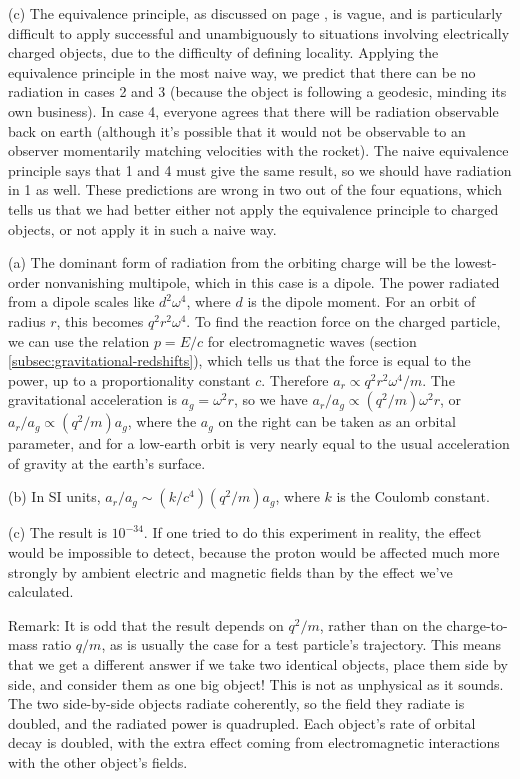 (c) The equivalence principle, as discussed on page \pageref{sec:chiao-paradox},
is vague, and is particularly difficult to apply successful and unambiguously to
situations involving electrically charged objects, due to the difficulty of
defining locality. Applying the equivalence principle in the most naive way,
we predict that there can be no radiation in cases 2 and 3 (because the object is
following a geodesic, minding its own business).
In case 4, everyone agrees that there will be radiation observable back on earth
(although it's possible that it would not be observable to an observer momentarily
matching velocities with the rocket).
The naive equivalence principle says that 1 and 4 must give the same result, so
we should have radiation in 1 as well. These predictions are wrong in two out of
the four equations, which tells us that we had better either not apply the equivalence
principle to charged objects, or not apply it in such a naive way.


(a) The dominant form of radiation from the orbiting charge will be the lowest-order
nonvanishing multipole, which in this case is a dipole. The power radiated from
a dipole scales like $d^2\omega^4$, where $d$ is the dipole moment. For an orbit of
radius $r$, this becomes $q^2r^2\omega^4$. To find the reaction force on the charged particle,
we can use the relation $p=E/c$ for electromagnetic waves (section \ref{subsec:gravitational-redshifts}),
which tells us that the force is equal to the power, up to a proportionality constant $c$.
Therefore $a_r\propto q^2r^2\omega^4/m$. The gravitational acceleration is $a_g=\omega^2 r$,
so we have $a_r/a_g \propto (q^2/m)\omega^2 r$, or $a_r/a_g \propto (q^2/m)a_g$, where the
$a_g$ on the right can be taken as an orbital parameter, and for a low-earth orbit is very nearly equal to
the usual acceleration of gravity at the earth's surface.

(b) In SI units, $a_r/a_g \sim (k/c^4)(q^2/m)a_g$, where $k$ is the Coulomb constant.

(c) The result is $10^{-34}$. If one tried to do this experiment in reality, the effect would be
impossible to detect, because the proton would be affected much more strongly by ambient electric and
magnetic fields than by the effect we've calculated.

Remark: It is odd that the result depends on $q^2/m$, rather than on the charge-to-mass ratio $q/m$,
as is usually the case for a test particle's trajectory. This means that we get a different answer
if we take two identical objects, place them side by side, and consider them as one big object! This is not as unphysical
as it sounds. The two side-by-side objects radiate coherently, so the field they radiate is doubled, and the
radiated power is quadrupled. Each object's rate of orbital decay is doubled, with the extra effect coming
from electromagnetic interactions with the other object's fields.

